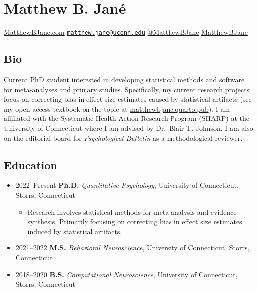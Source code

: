 \documentclass[
  letterpaper,
  DIV=11,
  numbers=noendperiod]{scrartcl}
\author{}
\date{}
\providecommand{\tightlist}{%
  \setlength{\itemsep}{0pt}\setlength{\parskip}{0pt}}\usepackage{longtable,booktabs,array}
\begin{document}
\ifdefined\Shaded\renewenvironment{Shaded}{\begin{tcolorbox}[breakable, boxrule=0pt, enhanced, frame hidden, borderline west={3pt}{0pt}{shadecolor}, sharp corners, interior hidden]}{\end{tcolorbox}}\fi

\hypertarget{matthew-b.-januxe9}{%
\section{Matthew B. Jané}\label{matthew-b.-januxe9}}

 \href{https://www.matthewbjane.com}{MatthewBJane.com}
\textbar{} 
\href{mailto:matthew.jane@uconn.edu}{\nolinkurl{matthew.jane@uconn.edu}}
\textbar{} 
\href{https://www.twitter.com/MatthewBJane}{@MatthewBJane} \textbar{}
 \href{https://www.github.io/MatthewBJane}{MatthewBJane}

\hypertarget{bio}{%
\subsection{\texorpdfstring{ Bio}{ Bio}}\label{bio}}

Current PhD student interested in developing statistical methods and
software for meta-analyses and primary studies. Specifically, my current
research projects focus on correcting bias in effect size estimates
caused by statistical artifacts (see my open-access textbook on the
topic at
\href{https://matthewbjane.quarto.pub}{matthewbjane.quarto.pub}). I am
affiliated with the Systematic Health Action Research Program (SHARP) at
the University of Connecticut where I am advised by Dr.~Blair T.
Johnson. I am also on the editorial board for \emph{Psychological
Bulletin} as a methodological reviewer.

\hypertarget{education}{%
\subsection{\texorpdfstring{ Education}{ Education}}\label{education}}

\begin{itemize}
\item
  2022--Present \textbar{} \textbf{Ph.D.} \emph{Quantitative
  Psychology}, University of Connecticut, Storrs, Connecticut

  \begin{itemize}
  \tightlist
  \item
    Research involves statistical methods for meta-analysis and evidence
    synthesis. Primarily focusing on correcting bias in effect size
    estimates induced by statistical artifacts.
  \end{itemize}
\item
  2021--2022 \textbar{} \textbf{M.S.} \emph{Behavioral Neuroscience},
  University of Connecticut, Storrs, Connecticut
\item
  2018--2020 \textbar{} \textbf{B.S.} \emph{Computational Neuroscience},
  University of Connecticut, Storrs, Connecticut
\end{itemize}
\end{document}
